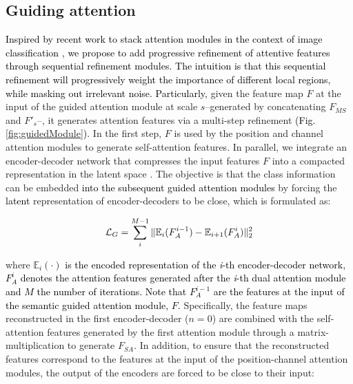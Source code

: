 \documentclass[journal]{IEEEtran}
\begin{document}
\subsection{Guiding attention}
\label{ssec:guide}
\textcolor{black}{Inspired by recent work to stack attention modules in the context of image classification \cite{ji2018stacked}, we propose to add progressive refinement of attentive features through sequential refinement modules. The intuition is that this sequential refinement will progressively weight the importance of different local regions, while masking out irrelevant noise. Particularly,} given the feature map $F$ at the input of the guided attention module at scale $s$--generated by concatenating $F_{MS}$ and $F'_{s}$--, it generates attention features via a multi-step refinement \textcolor{black}{(Fig. \ref{fig:guidedModule})}. In the first step, $F$ is used by the position and channel attention modules to generate self-attention features. In parallel, we integrate an encoder-decoder network that compresses the input features $F$ into a compacted representation in the latent space \textcolor{black}{\cite{ji2018stacked}}. The objective is that the class information can be embedded \textcolor{black}{into the subsequent guided attention modules} by forcing the \textcolor{black}{latent} representation of encoder-decoders to be close, which is formulated as:


\begin{equation}
    \textcolor{black}{\mathcal{L}_{G} = \sum_{i}^{M-1} \|\mathbb{E}_i(F_{A}^{i-1})-\mathbb{E}_{i+1}(F_{A}^i)\|_2^2}
\end{equation}

where \textcolor{black}{$\mathbb{E}_i(\cdot)$ is the encoded representation of the \textit{i}-th encoder-decoder network, $F_{A}^i$ denotes the attention features generated after the \textit{i}-th dual attention module and $M$ the number of iterations. Note that $F_{A}^{i-1}$ are the features at the input of the semantic guided attention module, $F$.} Specifically, the feature maps reconstructed in the first encoder-decoder ($n=0$) are combined with the self-attention features generated by the first attention module through a matrix-multiplication to generate $F_{SA}$. In addition, to ensure that the reconstructed features correspond to the features at the input of the position-channel attention modules, the output of the encoders are forced to be close to their input: 
\end{document}
